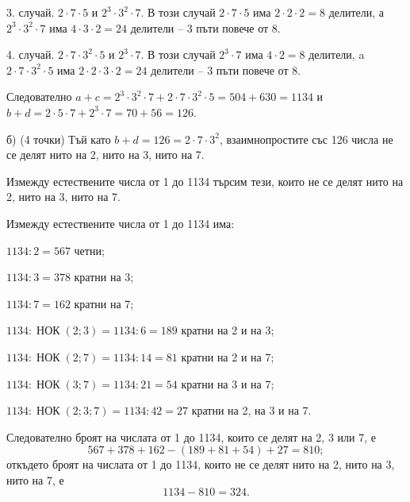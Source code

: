 3. случай. $2\cdot7\cdot5$ и $2^3\cdot3^2\cdot7$. В този случай $2\cdot7\cdot5$ има $2\cdot2\cdot2=8$ делители, а $2^3\cdot3^2\cdot7$ има $4\cdot3\cdot2=24$ делители – 3 пъти повече от 8.

4. случай. $2\cdot7\cdot3^2\cdot5$ и $2^3\cdot7$. В този случай $2^3\cdot7$ има $4\cdot2=8$ делители, a $2\cdot7\cdot3^2\cdot5$ има $2\cdot2\cdot3\cdot2=24$ делители – 3 пъти повече от 8.

Следователно $a+c=2^3\cdot3^2\cdot7+2\cdot7\cdot3^2\cdot5=504+630=1134$ и $b+d=2\cdot5\cdot7+2^3\cdot7=70+56=126$.

б) (4 точки) Тъй като $b+d=126=2\cdot7\cdot3^2$, взаимнопростите със 126 числа не се делят нито на 2, нито на 3, нито на 7.

Измежду естествените числа от 1 до 1134 търсим тези, които не се делят нито на 2, нито на 3, нито на 7.

Измежду естествените числа от 1 до 1134 има:

$1134:2=567$ четни;

$1134:3=378$ кратни на 3;

$1134:7=162$ кратни на 7;

$1134:\operatorname{НОК}(2;3)=1134:6=189$ кратни на 2 и на 3;

$1134:\operatorname{НОК}(2;7)=1134:14=81$ кратни на 2 и на 7;

$1134:\operatorname{НОК}(3;7)=1134:21=54$ кратни на 3 и на 7;

$1134:\operatorname{НОК}(2;3;7)=1134:42=27$ кратни на 2, на 3 и на 7.

Следователно броят на числата от 1 до 1134, които се делят на 2, 3 или 7, е
$$
567+378+162-(189+81+54)+27=810;
$$
откъдето броят на числата от 1 до 1134, които не се делят нито на 2, нито на 3, нито на 7, е
$$
1134-810=324.
$$
